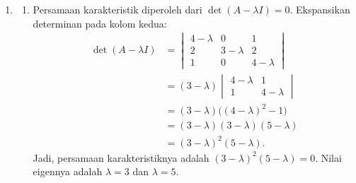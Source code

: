 \documentclass[11pt,a4paper]{article}
\begin{document}
\begin{enumerate}[itemsep=12pt,parsep=5pt]
  \item
        \begin{enumerate}
          \item Persamaan karakteristik diperoleh dari $\det(A-\lambda I)=0$.
                Ekspansikan determinan pada kolom kedua:
                \begin{align*}
                  \det(A-\lambda I)
                   & =\begin{vmatrix}4-\lambda&0&1\\2&3-\lambda&2\\1&0&4-\lambda\end{vmatrix} \\
                   & =(3-\lambda)\begin{vmatrix}4-\lambda&1\\1&4-\lambda\end{vmatrix}         \\
                   & =(3-\lambda)\bigl((4-\lambda)^2-1\bigr)                                  \\
                   & =(3-\lambda)(3-\lambda)(5-\lambda)                                       \\
                   & =(3-\lambda)^2(5-\lambda).
                \end{align*}
                Jadi, persamaan karakteristiknya adalah $(3-\lambda)^2(5-\lambda)=0$.
                Nilai eigennya adalah $\lambda=3$ dan $\lambda=5$.


\end{enumerate}
\end{enumerate}
\end{document}
